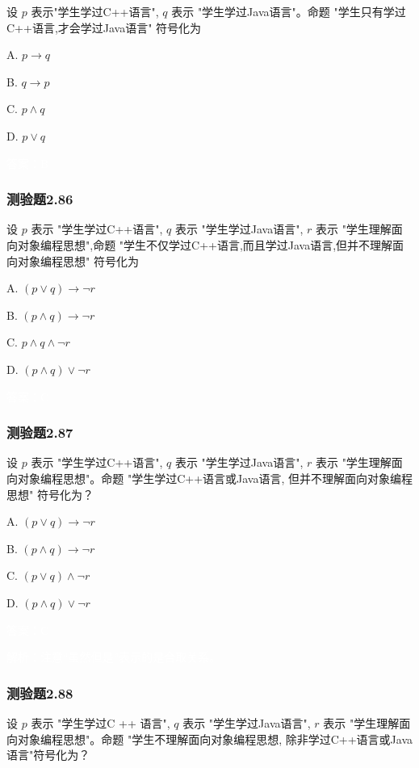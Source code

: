 \documentclass[UTF8, heading=true]{ctexart}
\begin{document}
设 $p$ 表示"学生学过C++语言", $q$ 表示 "学生学过Java语言"。命题 "学生只有学过C++语言,才会学过Java语言" 符号化为 $\qquad$

A. $
p \rightarrow q
$

B. $
q \rightarrow p
$

C. $
p \wedge q
$

D. $
p \vee q
$

\textcolor{white}{答案：B}

\subsubsection{测验题2.86}

设 $p$ 表示 "学生学过C++语言", $q$ 表示 "学生学过Java语言", $r$ 表示 "学生理解面向对象编程思想",命题 "学生不仅学过C++语言,而且学过Java语言,但并不理解面向对象编程思想" 符号化为

A. $
(p \vee q) \rightarrow \neg r
$

B. $
(p \wedge q) \rightarrow \neg r
$

C. $
p \wedge q \wedge \neg r
$

D. $
(p \wedge q) \vee \neg r
$

\textcolor{white}{答案：C}



\subsubsection{测验题2.87}

设 $p$ 表示 "学生学过C++语言", $q$ 表示 "学生学过Java语言", $r$ 
表示 "学生理解面向对象编程思想"。命题 "学生学过C++语言或Java语言, 
但并不理解面向对象编程思想" 符号化为？

A. $(p \vee q) \rightarrow \neg r$

B. $(p \wedge q) \rightarrow \neg r$

C. $(p \vee q) \wedge \neg r$

D. $(p \wedge q) \vee \neg r$

\textcolor{white}{答案：C}

\textcolor{white}{解析：注意“虽然但是”表示的是合取关系。}

\subsubsection{测验题2.88}

设 $p$ 表示 "学生学过C ++ 语言", $q$ 表示 "学生学过Java语言", $r$ 表示 
"学生理解面向对象编程思想"。命题 "学生不理解面向对象编程思想,
除非学过C++语言或Java语言"符号化为？
\end{document}
